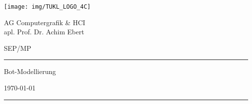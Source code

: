 \thispagestyle{empty}
	\newcommand{\Rule}{\rule{\textwidth}{0.5mm}}
	\begin{center}
	{\Large \texttt{[image: img/TUKL\_LOGO\_4C]} \par}

	\vspace{0.5em}

	{\Large AG Computergrafik \& HCI \\ apl. Prof. Dr. Achim Ebert \par}

	\vspace{0.5em}

	{\Large SEP/MP \the\year \par}


	\vspace{5cm}

	\Rule

	\vspace{1cm}

	{\Huge Bot-Modellierung \par}

	\vspace{0.5em}

	{\Large \mysubject \par}

	\vspace{0.5em}

	{\small \today \par}

	\vspace{0.7cm}

	\Rule


	\vfill %


	\emph{\textbf{\mygroup}} \\[1em]
	\myauthor

	\end{center}
